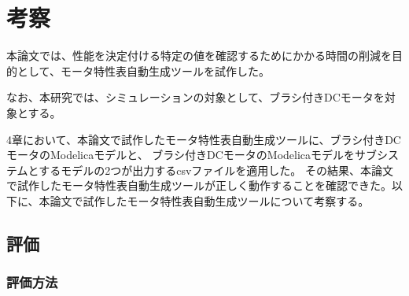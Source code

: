 \chapter{考察}\label{cha:Discussion}
本論文では、性能を決定付ける特定の値を確認するためにかかる時間の削減を目的として、モータ特性表自動生成ツールを試作した。

なお、本研究では、シミュレーションの対象として、ブラシ付きDCモータを対象とする。

4章において、本論文で試作したモータ特性表自動生成ツールに、ブラシ付きDCモータのModelicaモデルと、
ブラシ付きDCモータのModelicaモデルをサブシステムとするモデルの2つが出力するcsvファイルを適用した。
その結果、本論文で試作したモータ特性表自動生成ツールが正しく動作することを確認できた。以下に、本論文で試作したモータ特性表自動生成ツールについて考察する。
\section{評価}

\subsection{評価方法}




